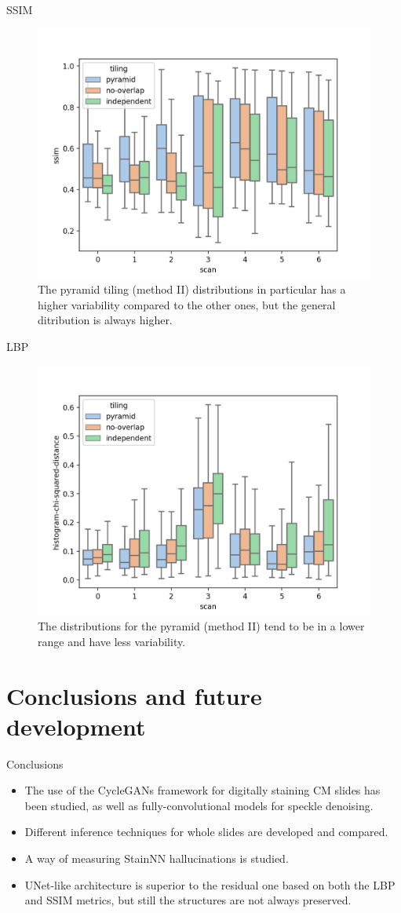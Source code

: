 \documentclass[t]{beamer}
\begin{document}
\begin{frame}{SSIM}
\begin{figure}
\centering
\includegraphics[width=0.65\linewidth]{inference-boxplot-ssim}
\caption{The pyramid
tiling (method II) distributions in particular has a higher variability compared to the
other ones, but the general ditribution is always higher.}
\end{figure}
\end{frame}

\begin{frame}{LBP}
\begin{figure}
\centering
\includegraphics[width=0.65\linewidth]{inference-boxplot-lbp}
\caption{The distributions for the pyramid (method II) tend to be in a lower range and
have less variability.}
\end{figure}
\end{frame}


\section{Conclusions and future development}

\begin{frame}{Conclusions}
\begin{itemize}
\item The use of the CycleGANs framework for digitally staining CM slides
has been studied, as well as fully-convolutional models for speckle denoising.
\item Different inference techniques for whole slides are developed and compared.
\item A way of measuring StainNN hallucinations is studied.
\item UNet-like architecture is superior to the
residual one based on both the LBP and SSIM metrics, but
still the structures are not always preserved.
\end{itemize}
\end{frame}
\end{document}
